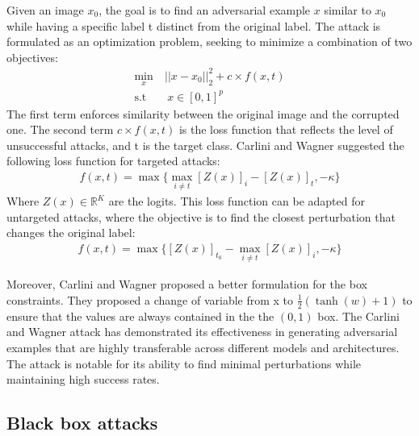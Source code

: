 \documentclass[11pt,twocolumn,letterpaper]{article}
\begin{document}
Given an image $x_0$, the goal is to find an adversarial example $x$ similar to $x_0$ while having a specific label t distinct from the original label. The attack is formulated as an optimization problem, seeking to minimize a combination of two objectives:
\begin{align*}
   \min_x &\ ||x - x_0||_2^2 + c \times f(x,t) \\
    \text{s.t } &\ \ x \in [0,1]^p
\end{align*}
The first term enforces similarity between the original image and the corrupted one. The second term $ c \times f(x,t) $ is the loss function that reflects the level of unsuccessful attacks, and t is the target class. Carlini and Wagner suggested the following loss function for targeted attacks:
\begin{align*}
    f(x,t) = \max \{ \max_{i \neq t}[Z(x)]_i - [Z(x)]_t, -\kappa \}
\end{align*}
Where $Z(x) \in \mathbb{R}^K$ are the logits. 
This loss function can be adapted for untargeted attacks, where the objective is to find the closest perturbation that changes the original label:
\begin{align*}
    f(x,t) = \max \{[Z(x)]_{t_0} - \max_{i \neq t}[Z(x)]_i, -\kappa \}
\end{align*}

Moreover, Carlini and Wagner proposed a better formulation for the box constraints. They proposed a change of variable from x to $\frac{1}{2} (\tanh(w) + 1)$ to ensure that the values are always contained in the the $(0,1)$ box.
The Carlini and Wagner attack has demonstrated its effectiveness in generating adversarial examples that are highly transferable across different models and architectures. The attack is notable for its ability to find minimal perturbations while maintaining high success rates.
\subsection{Black box attacks}

\paragraph{}
\end{document}
